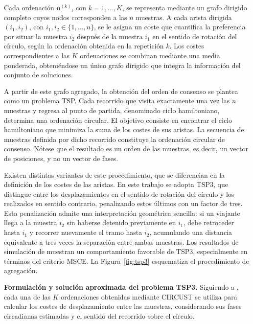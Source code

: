 \documentclass[12pt, a4paper]{report}
\begin{document}
Cada ordenación \(\mathbf{o}^{(k)}\), con \(k=1,\ldots,K\), se representa mediante un grafo dirigido completo cuyos nodos corresponden a las \(n\) muestras. A cada arista dirigida \((i_1,i_2)\), con \(i_1,i_2\in\{1,\ldots,n\}\), se le asigna un coste que cuantifica la preferencia por situar la muestra \(i_2\) después de la muestra \(i_1\) en el sentido de rotación del círculo, según la ordenación obtenida en la repetición \(k\). Los costes correspondientes a las \(K\) ordenaciones se combinan mediante una media ponderada, obteniéndose un único grafo dirigido que integra la información del conjunto de soluciones.

A partir de este grafo agregado, la obtención del orden de consenso se plantea como un problema TSP. Cada recorrido que visita exactamente una vez las \(n\) muestras y regresa al punto de partida, denominado ciclo hamiltoniano, determina una ordenación circular. El objetivo consiste en encontrar el ciclo hamiltoniano que minimiza la suma de los costes de sus aristas. La secuencia de muestras definida por dicho recorrido constituye la ordenación circular de consenso. Nótese que el resultado es un orden de las muestras, es decir, un vector de posiciones, y no un vector de fases. 

Existen distintas variantes de este procedimiento, que se diferencian en la definición de los costes de las aristas. En este trabajo se adopta TSP3, que distingue entre los desplazamientos en el sentido de rotación del círculo y los realizados en sentido contrario, penalizando estos últimos con un factor de tres. Esta penalización admite una interpretación geométrica sencilla: si un viajante llega a la muestra \(i_2\) sin haberse detenido previamente en \(i_1\), debe retroceder hasta \(i_1\) y recorrer nuevamente el tramo hasta \(i_2\), acumulando una distancia equivalente a tres veces la separación entre ambas muestras. Los resultados de simulación de \citet{barragan2015} muestran un comportamiento favorable de TSP3, especialmente en términos del criterio MSCE. La Figura~\ref{fig:tsp3} esquematiza el procedimiento de agregación.

\noindent\textbf{Formulación y solución aproximada del problema TSP3.} Siguiendo a \citet{barragan2015}, cada una de las \(K\) ordenaciones obtenidas mediante CIRCUST se utiliza para calcular los costes de desplazamiento entre las muestras, considerando sus fases circadianas estimadas y el sentido del recorrido sobre el círculo.
\end{document}
